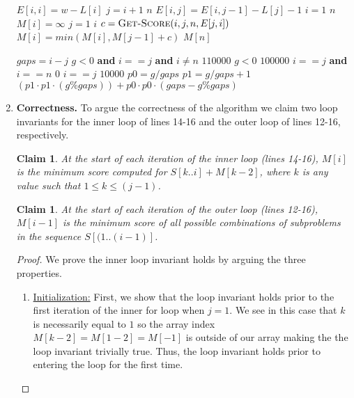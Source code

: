 \documentclass[11pt]{article}
\newtheorem{claim}[theorem]{Claim}
\theoremstyle{nonumberplain}
\newtheorem{proof}{Proof}
\begin{document}
\begin{enumerate}
\begin{codebox}
\li     $E[i,i]=w-L[i]$
\li     \For $j=i+1$ \To $n$ \Do
\li         $E[i,j]=E[i,j-1]-L[j]-1$
        \End
    \End
\li \For $i=1$ \To $n$ \Do
\li     $M[i]=\infty$
\li     \For $j=1$ \To $i$ \Do
\li         $c=\textnormal{\scshape Get-Score}(i,j,n,E[j,i])$
\li         $M[i]=min(M[i],M[j-1]+c)$
        \End
    \End
\li \Return $M[n]$    
\end{codebox}
\begin{codebox}
\li $gaps=i-j$
\li \If $g<0$ \textbf{and} $i==j$ \textbf{and} $i \neq n$ \Do
\li     \Return $110000$
\li \Else \If $g<0$
\li     \Return $100000$
\li \Else \If $i==j$ \textbf{and} $i==n$
\li     \Return $0$
\li \Else \If $i==j$
\li     \Return $10000$
\li \Else
\li     $p0=g/gaps$
\li     $p1=g/gaps+1$
\li     \Return $(p1 \cdot p1 \cdot (g\%gaps))+p0 \cdot p0 \cdot (gaps-g\%gaps)$
    \End
\end{codebox}
\item \textbf{Correctness.} %
  To argue the correctness of the algorithm we claim two loop invariants for the inner loop of lines 14-16 and the outer loop of lines 12-16, respectively.
  \begin{claim}
  At the start of each iteration of the inner loop (lines 14-16), $M[i]$ is the minimum score computed for $S[k..i]+M[k-2]$, where $k$ is any value such that $1 \le k \le (j-1)$.
  \end{claim}
  \begin{claim}
  At the start of each iteration of the outer loop (lines 12-16), $M[i-1]$ is the minimum score of all possible combinations of subproblems in the sequence $S[(1..(i-1)]$.
  \end{claim}
  \pagebreak
  \begin{proof}
  We prove the inner loop invariant holds by arguing the three properties.
  \begin{enumerate}
      \item \ul{Initialization:} First, we show that the loop invariant holds prior to the first iteration of the inner for loop when $j=1$. We see in this case that $k$ is necessarily equal to $1$ so the array index $M[k-2]=M[1-2]=M[-1]$ is outside of our array making the the loop invariant trivially true. Thus, the loop invariant holds prior to entering the loop for the first time.

\end{enumerate}
\end{proof}
\end{enumerate}
\end{document}
